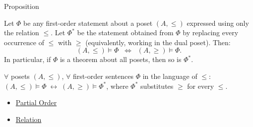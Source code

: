 \begin{propositionbox}{Proposition}
\begin{proposition}
\label{prop:order-duality}
Let $\Phi$ be any first-order statement about a poset $(A, \leq)$ expressed
using only the relation $\leq$.  Let $\Phi^*$ be the statement obtained from
$\Phi$ by replacing every occurrence of $\leq$ with $\geq$ (equivalently,
working in the dual poset).  Then:
\[
  (A, \leq) \models \Phi
  \;\;\Longleftrightarrow\;\;
  (A, \geq) \models \Phi.
\]
In particular, if $\Phi$ is a theorem about all posets, then so is $\Phi^*$.
\end{proposition}
\end{propositionbox}

\begin{remark*}
$\forall$ posets $(A,\leq)$, $\forall$ first-order sentences $\Phi$ in the
language of $\leq$: $(A,\leq)\models\Phi \;\leftrightarrow\; (A,\geq)\models\Phi^*$,
where $\Phi^*$ substitutes $\geq$ for every $\leq$.
\end{remark*}

\begin{dependencies}
\begin{itemize}
  \item \hyperref[def:partial-order]{Partial Order}
  \item \hyperref[def:relation]{Relation}
\end{itemize}
\end{dependencies}

